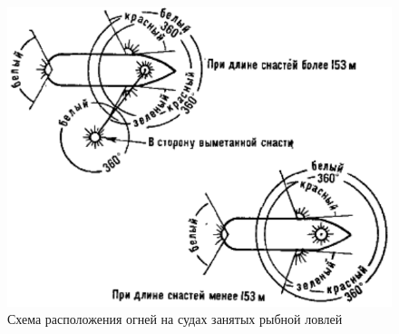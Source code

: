 \documentclass[a4paper, 12pt, twoside, final]{scrbook}
\begin{document}
\begin{figure}[htbp]
   \centering
   \includegraphics{pics/142_Ogni} %
   \caption{Схема расположения огней на судах занятых рыбной ловлей}
   \label{fig:142}
\end{figure}
\end{document}
